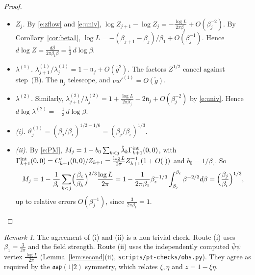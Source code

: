 \documentclass[11pt]{amsart}
\theoremstyle{definition}
\theoremstyle{remark}
\newtheorem{remark}[theorem]{Remark}
\numberwithin{equation}{section}
\begin{document}
\begin{proof}
\begin{itemize}
\item \emph{$Z_j$.} By \eqref{e:zflow} and \eqref{e:univ},
  $\log Z_{j+1}-\log Z_j=-\frac{\log L}{2\pi\beta_j}+O(\beta_j^{-2})$. By
  Corollary~\ref{cor:beta1}, $\log L=-(\beta_{j+1}-\beta_j)/\beta_1+O(\beta_j^{-1})$. Hence
  $d\log Z=\frac{d\beta}{2\pi\beta_1\beta}=\frac13\,d\log\beta$.
\item \emph{$\lambda^{(1)}$.} $\lambda^{(1)}_{j+1}/\lambda^{(1)}_j=1-\mathfrak n_j+O(\bar g^2)$.
  The factors $Z^{1/2}$ cancel against step~(B). The $\mathfrak n_j$ telescope, and $\nu w'^{(1)}=O(\check g)$.
\item \emph{$\lambda^{(2)}$.} Similarly,
  $\lambda^{(2)}_{j+1}/\lambda^{(2)}_j=1+\frac{\log L}{2\pi\beta_j}-2\mathfrak n_j+O(\beta_j^{-2})$
  by \eqref{e:univ}. Hence $d\log\lambda^{(2)}=-\frac13\,d\log\beta$.
\item \emph{(i).} $\vartheta^{(1)}_j=(\beta_j/\beta_\epsilon)^{1/2-1/6}=(\beta_j/\beta_\epsilon)^{1/3}$.
\item \emph{(ii).} By \eqref{e:PM}, $M_j=1-b_0\sum_{k<j}\hat\lambda_k\Gamma^{\rm int}_{k+1}(0,0)$,
  with $\Gamma^{\rm int}_{k+1}(0,0)=C'_{k+1}(0,0)/Z_{k+1}=\frac{\log L}{2\pi}Z_{k+1}^{-1}(1+O(\cdot))$
  and $b_0=1/\beta_\epsilon$. So
  \[
    M_j=1-\frac1{\beta_\epsilon}\sum_{k<j}\Bigl(\frac{\beta_\epsilon}{\beta_k}\Bigr)^{2/3}\frac{\log L}{2\pi}
    =1-\frac1{2\pi\beta_1}\beta_\epsilon^{-1/3}\int_{\beta_j}^{\beta_\epsilon}\beta^{-2/3}d\beta
    =\Bigl(\frac{\beta_j}{\beta_\epsilon}\Bigr)^{1/3},
  \]
  up to relative errors $O(\beta_j^{-1})$, since $\frac{3}{2\pi\beta_1}=1$.
\end{itemize}
\end{proof}

\begin{remark}
The agreement of (i) and (ii) is a non-trivial check. Route (i) uses $\beta_1=\frac3{2\pi}$ and
the field strength. Route (ii) uses the independently computed $\bar\psi\psi$ vertex
$\frac{\log L}{2\pi}$ (Lemma~\ref{lem:second}(ii), \texttt{scripts/pt-checks/obs.py}). They agree as
required by the $\mathfrak{osp}(1|2)$ symmetry, which relates $\xi,\eta$ and $z=1-\xi\eta$.
\end{remark}
\end{document}
